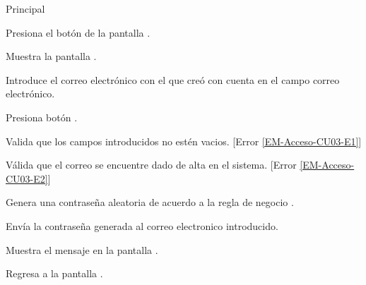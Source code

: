 	\begin{UCtrayectoria}{Principal}

		\UCpaso[\UCactor] Presiona el botón  de la pantalla .

		\UCpaso Muestra la pantalla .

		\UCpaso[\UCactor] Introduce el correo electrónico con el que creó con cuenta en el campo correo electrónico. \label{l_Acceso_CU3_E1}

		\UCpaso[\UCactor] Presiona botón .

		\UCpaso Valida que los campos introducidos no estén vacios. [Error \ref{EM-Acceso-CU03-E1}]

		\UCpaso	 Válida que el correo se encuentre dado de alta en el sistema. [Error \ref{EM-Acceso-CU03-E2}] 

		\UCpaso Genera una contraseña aleatoria de acuerdo a la regla de negocio .

		\UCpaso Envía la contraseña generada al correo electronico introducido.

	    \UCpaso Muestra el mensaje  en la pantalla .

	    \UCpaso Regresa a la pantalla .
	
	\end{UCtrayectoria}



		
